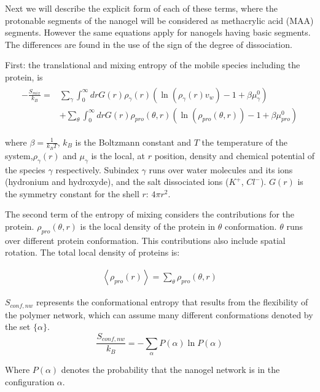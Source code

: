 Next we will describe the explicit form of each of these terms, where the protonable segments of the nanogel will be considered as methacrylic acid (MAA) segments. However the same equations apply for nanogels having  basic segments. The differences are found in the use of the sign of the degree of dissociation.

First:  the translational and mixing entropy of the mobile species including the protein, is
\begin{align}
	\begin{aligned}
		-\frac{S_{mix}}{k_B}= &\sum_{\gamma}\int_0^\infty{dr G(r)\rho_\gamma(r)\left(\ln \left(\rho_\gamma (r)v_w\right) -1 + \beta\mu^0_\gamma\right)} \\
		&+ \sum_{\theta}\int_0^\infty{dr G(r)\rho_{pro}(\theta,r)\left(\ln \left(\rho_{pro}(\theta,r)\right) -1 + \beta\mu^0_{pro} \right)}
	\end{aligned}
\end{align}

\noindent where $\beta = \frac{1}{k_BT}$, $k_B$ is the Boltzmann constant and $T$ the temperature of the system,$\rho_\gamma(r)$ and $\mu_\gamma$ is the local, at $r$ position, density and chemical potential of the species $\gamma$ respectively. 
Subindex $\gamma$ runs over water molecules and its ions (hydronium and hydroxyde), and the salt dissociated ions ($K^+$, $Cl^-$). $G(r)$ is the symmetry constant for the shell $r$: $4\pi r^2$.

The second term of the entropy of mixing considers the contributions for the protein.
$\rho_{pro}(\theta,r)$ is the local density of the protein in $\theta$ conformation.
$\theta$ runs over different protein conformation. 
This contributions also include spatial rotation.
The total local density of proteins is:

\begin{align}
	\left<\rho_{pro}(r)\right> = \sum_\theta{\rho_{pro}(\theta,r)}
\end{align}

$S_{conf,nw}$ represents the conformational entropy that results from the flexibility of the polymer network, which can assume many different conformations denoted by the set $\{\alpha\}$. 
\begin{equation}
	\frac{S_{conf,nw}}{k_B} = - \sum_{\alpha}{P(\alpha)\ln P(\alpha)}
\end{equation}

\noindent Where $P(\alpha)$ denotes the probability that the nanogel network is in the configuration $\alpha$.

